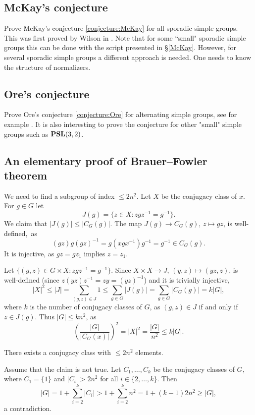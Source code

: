 \subsection*{McKay's conjecture}

Prove McKay's conjecture \ref{conjecture:McKay} for all sporadic simple groups. 
This was first proved by Wilson in \cite{MR1643110}. 
Note that
for some ``small" sporadic simple groups this can be done
with the script presented in \S\ref{McKay}. However, 
for several sporadic simple groups a different approach is needed. One needs
to know the structure of normalizers. 

\subsection*{Ore's conjecture}

Prove Ore's conjecture \ref{conjecture:Ore} for alternating simple groups,
see for example \cite{MR40298}. It is also interesting to prove the conjecture
for other "small" simple groups such as $\mathbf{PSL}(3,2)$.  

\subsection*{An elementary proof of Brauer--Fowler theorem}

We need to find a subgroup of index $\leq 2n^2$. 
Let $X$ be the conjugacy class of $x$. For $g\in G$ let
\[
J(g)=\{z\in X:zgz^{-1}=g^{-1}\}.
\]
We claim that $|J(g)|\leq|C_G(g)|$. The map $J(g)\to C_G(g)$, $z\mapsto gz$, 
is well-defined,~as 
\[
(gz)g(gz)^{-1}=g(xgx^{-1})g^{-1}=g^{-1}\in C_G(g).
\]
It is injective, as $gz=gz_1$ implies $z=z_1$.

Let $\{(g,z)\in G\times X:zgz^{-1}=g^{-1}\}$.  
Since $X\times X\to J$, $(y,z)\mapsto (yz,z)$, 
is well-defined (since $z(yz)z^{-1}=zy=(yz)^{-1}$) and
it is trivially injective, 
\[
|X|^2\leq |J|=\sum_{(g,z)\in J}1\leq\sum_{g\in G}|J(g)|
=\sum_{g\in G}|C_G(g)|=k|G|,
\]
where $k$ is the number of conjugacy classes of $G$, 
as $(g,z)\in J$ if and only if $z\in J(g)$. Thus $|G|\leq kn^2$, as
\[
\left(\frac{|G|}{|C_G(x)|}\right)^2=|X|^2=\frac{|G|}{n^2}\leq k|G|.
\]

\begin{claim}
    There exists a conjugacy class with $\leq 2n^2$ elements.
\end{claim}

Assume that the claim is not true. Let
$C_1,\dots,C_k$ be the conjugacy classes of $G$, where 
$C_1=\{1\}$ and $|C_i|>2n^2$ for all $i\in\{2,\dots,k\}$. Then
\[
|G|=1+\sum_{i=2}^k|C_i|>1+\sum_{i=2}^kn^2=1+(k-1)2n^2\geq |G|,
\]
a contradiction. 


